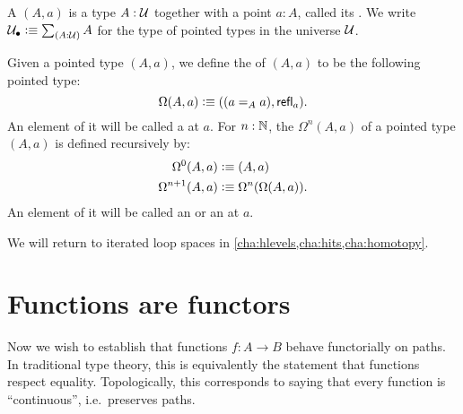 \begin{defn} \label{def:pointedtype}
  A 
  $(A,a)$ is a type $A:\type$ together with a point $a:A$, called its .
  We write $\pointed{\type} \defeq \sm{A:\type} A$ for the type of pointed types in the universe $\type$.
\end{defn}

\begin{defn} \label{def:loopspace}
  Given a pointed type $(A,a)$, we define the 
  of $(A,a)$ to be the following pointed type:
  \[\Omega(A,a)\defeq ((\id[A]aa),\refl a).\]
  An element of it will be called a  at $a$.
  For $n:\N$, the  $\Omega^{n}(A,a)$
  of a pointed type $(A,a)$ is defined recursively by:
  \begin{align*}
    \Omega^0(A,a)&\defeq(A,a)\\
    \Omega^{n+1}(A,a)&\defeq\Omega^n(\Omega(A,a)).
  \end{align*}
  An element of it will be called an 
  or an 
  at $a$.
\end{defn}

We will return to iterated loop spaces in \autoref{cha:hlevels,cha:hits,cha:homotopy}.
%
%

\section{Functions are functors}
\label{sec:functors}

%
%
Now we wish to establish that functions $f:A\to B$ behave functorially on paths.
In traditional type theory, this is equivalently the statement that functions respect equality.
%
Topologically, this corresponds to saying that every function is ``continuous'', i.e.\ preserves paths.

